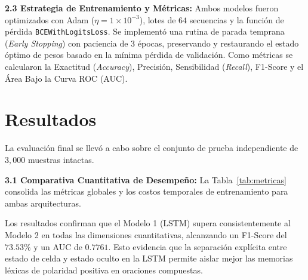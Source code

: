 \documentclass[letterpaper, 10 pt, conference]{ieeeconf}
\begin{document}
\textbf{2.3 Estrategia de Entrenamiento y Métricas:}
Ambos modelos fueron optimizados con Adam ($\eta = 1\times 10^{-3}$), lotes de $64$ secuencias y la función de pérdida \texttt{BCEWithLogitsLoss}. Se implementó una rutina de parada temprana (\textit{Early Stopping}) con paciencia de $3$ épocas, preservando y restaurando el estado óptimo de pesos basado en la mínima pérdida de validación. Como métricas se calcularon la Exactitud (\textit{Accuracy}), Precisión, Sensibilidad (\textit{Recall}), F1-Score y el Área Bajo la Curva ROC (AUC).

\section{Resultados}

La evaluación final se llevó a cabo sobre el conjunto de prueba independiente de $3{,}000$ muestras intactas.

\textbf{3.1 Comparativa Cuantitativa de Desempeño:}
La Tabla~\ref{tab:metricas} consolida las métricas globales y los costos temporales de entrenamiento para ambas arquitecturas.
\begin{table}[htbp]
    \centering
    \caption{Rendimiento comparativo sobre el conjunto de prueba ($3{,}000$ reseñas).}
    \label{tab:metricas}
\end{table}

Los resultados confirman que el Modelo 1 (LSTM) supera consistentemente al Modelo 2 en todas las dimensiones cuantitativas, alcanzando un F1-Score del $73.53\%$ y un AUC de $0.7761$. Esto evidencia que la separación explícita entre estado de celda y estado oculto en la LSTM permite aislar mejor las memorias léxicas de polaridad positiva en oraciones compuestas.
\end{document}

